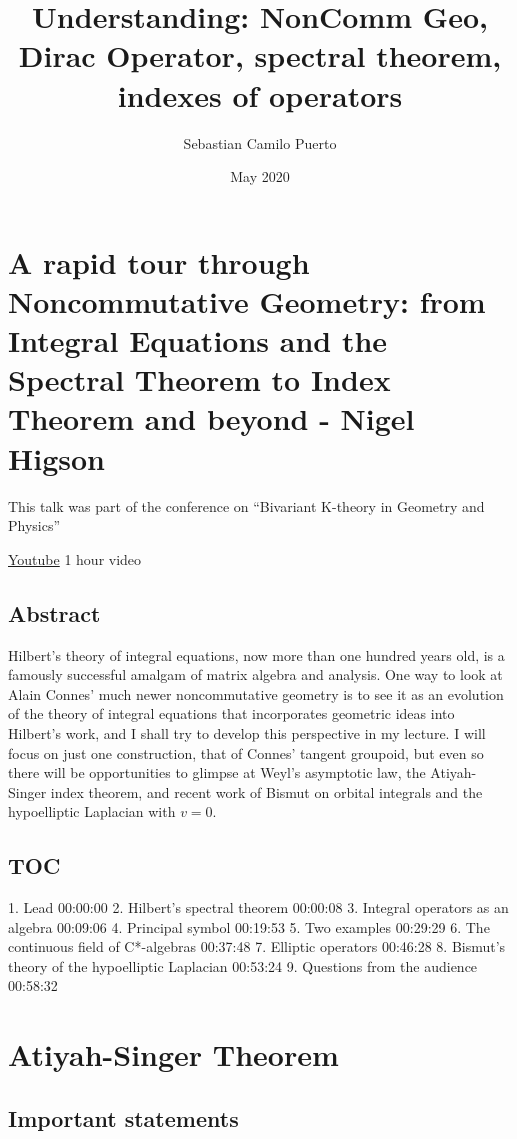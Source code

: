 \documentclass{article}
\title{Understanding: NonComm Geo, Dirac Operator, spectral theorem, indexes of operators}
\author{Sebastian Camilo Puerto}
\date{May 2020}
\begin{document}
\maketitle

\section{A rapid tour through Noncommutative Geometry: from Integral Equations and the Spectral Theorem to Index Theorem and beyond - Nigel Higson}

This talk was part of the conference on ``Bivariant K-theory in Geometry and Physics''


\href{https://www.youtube.com/watch?v=t_f7I8N93kw}{Youtube} 1 hour video

\subsection{Abstract}

Hilbert’s theory of integral equations, now more than one hundred years old, is a famously successful amalgam of matrix algebra and analysis. One way to look at Alain Connes’ much newer noncommutative geometry is to see it as an evolution of the theory of integral equations that incorporates geometric ideas into Hilbert’s work, and I shall try to develop this perspective in my lecture. I will focus on just one construction, that of Connes’ tangent groupoid, but even so there will be opportunities to glimpse at Weyl’s asymptotic law, the Atiyah-Singer index theorem, and recent work of Bismut on orbital integrals and the hypoelliptic Laplacian with $v=0$.

\subsection{TOC}

1. Lead 00:00:00
2. Hilbert's spectral theorem 00:00:08
3. Integral operators as an algebra 00:09:06
4. Principal symbol 00:19:53
5. Two examples 00:29:29
6. The continuous field of C*-algebras 00:37:48
7. Elliptic operators 00:46:28
8. Bismut's theory of the hypoelliptic Laplacian 00:53:24
9. Questions from the audience 00:58:32


\section{Atiyah-Singer Theorem}

\subsection{Important statements}
\end{document}
